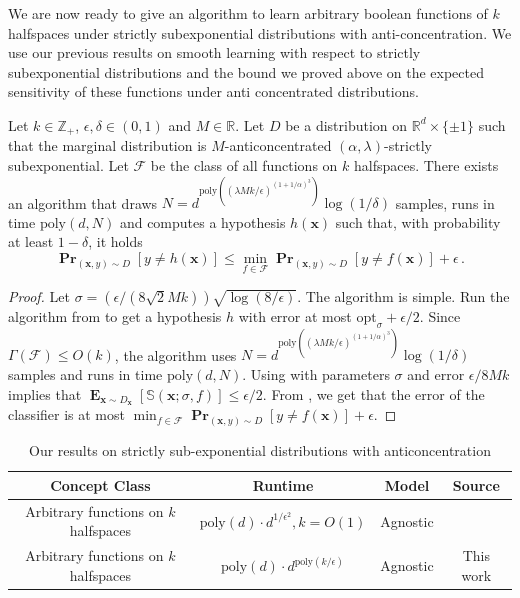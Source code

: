 \documentclass{theoretics}
\renewcommand\vec[1]{\mathbf{#1}}
\DeclareMathOperator*{\pr}{\mathbf{Pr}}
\DeclareMathOperator*{\E}{\mathbf{E}}
\newcommand{\R}{\mathbb{R}}
\newcommand{\poly}{\mathrm{poly}}
\newcommand{\1}{\Ind}
\newcommand{\smoothopt}{\mathrm{opt}_{\sigma}}
\newcommand{\x}{\vec x}
\newcommand{\F}{\mathcal{F}}
\begin{document}
We are now ready to give an algorithm to learn arbitrary boolean functions of $k$ halfspaces under strictly subexponential distributions with anti-concentration. We use our previous results on smooth learning with respect to strictly subexponential distributions and the bound we proved above on the expected sensitivity of these functions under anti concentrated distributions.
\begin{theorem}
\label{corollary: agnostic_subexp_functions_halfspaces}
Let $k\in \mathbb{Z}_{+}$, $\epsilon,\delta\in (0,1)$ and $M\in \R$. Let $D$ be a distribution on $\R^{d}\times \{\pm 1\}$ such that the marginal distribution is  $M$-anticoncentrated $(\alpha,\lambda)$-strictly subexponential. Let $\F$ be the class of all functions on $k$ halfspaces. There exists an algorithm that draws $N=d^{\poly((\lambda Mk/\epsilon)^{(1+1/\alpha)^3})}\log(1/\delta)$ samples, runs in time $\poly(d,N)$ and computes a hypothesis $h(\x)$ such that, with probability at least $1-\delta$, it holds
\[
    \pr_{(\x,y)\sim D}[y\neq h(\x)]\leq \min_{f\in \F}\pr_{(\x,y)\sim D}[y\neq f(\x)]+\epsilon\,.
\]
    
\end{theorem}
\begin{proof}
    Let $\sigma=(\epsilon/(8\sqrt{2}Mk))\sqrt{\log(8/\epsilon)}$. The algorithm is simple. Run the algorithm from  to get a hypothesis $h$ with error at most $\smoothopt+\epsilon/2$. Since $\Gamma(\F)\leq O(k)$, the algorithm uses $N=d^{\poly((\lambda Mk/\epsilon)^{(1+1/\alpha)^3})}\log(1/\delta)$ samples and runs in time $\poly(d,N)$. 
    Using  with parameters $\sigma$ and error $\epsilon/8Mk$ implies that $\E_{\x\sim D_\x}[\mathbb{S}(\x;\sigma,f)]\leq \epsilon/2$. From , we get that the error of the classifier is at most $\min_{f\in \F}\pr_{(\x,y)\sim D}[y\neq f(\x)]+\epsilon$.
\end{proof}



\begin{table}[ht]
\centering
\begin{tabular}{|c|c|c|c|}
\hline
Concept Class & Runtime & Model & Source \\
\hline
\hline
Arbitrary functions on $k$ halfspaces   & $\poly(d)\cdot d^{1/\epsilon^2},k=O(1)$ & Agnostic & \cite{gollakota_testable} \\
\hline
Arbitrary functions on $k$ halfspaces  & $\poly(d)\cdot d^{\poly(k/\epsilon)}$ & Agnostic & This work \\
\hline
\end{tabular}
\caption{Our results on strictly sub-exponential distributions with anticoncentration}
\label{tab:anticonc}
\end{table}
\end{document}
